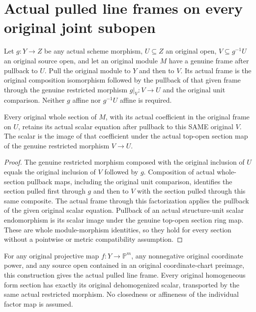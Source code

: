 \section{Actual pulled line frames on every original joint subopen}
\begin{definition}\label{def:actual-pullback-subopen-frame}
\leanok
{}
Let $g:Y\to Z$ be any actual scheme morphism, $U\subseteq Z$ an original open, $V\subseteq g^{-1}U$ an original source open, and let an original module $M$ have a genuine frame after pullback to $U$. Pull the original module to $Y$ and then to $V$. Its actual frame is the original composition isomorphism followed by the pullback of that given frame through the genuine restricted morphism $g|_V:V\to U$ and the original unit comparison. Neither $g$ affine nor $g^{-1}U$ affine is required.
\end{definition}
\begin{theorem}\label{thm:actual-pullback-subopen-scalar}
\leanok
{}
Every original whole section of $M$, with its actual coefficient in the original frame on $U$, retains its actual scalar equation after pullback to this SAME original $V$. The scalar is the image of that coefficient under the actual top-open section map of the genuine restricted morphism $V\to U$.
\end{theorem}
\begin{proof}
The genuine restricted morphism composed with the original inclusion of $U$ equals the original inclusion of $V$ followed by $g$. Composition of actual whole-section pullback maps, including the original unit comparison, identifies the section pulled first through $g$ and then to $V$ with the section pulled through this same composite. The actual frame through this factorization applies the pullback of the given original scalar equation. Pullback of an actual structure-unit scalar endomorphism is its scalar image under the genuine top-open section ring map. These are whole module-morphism identities, so they hold for every section without a pointwise or metric compatibility assumption.
\end{proof}
\begin{theorem}\label{thm:actual-projective-subopen-homogeneous-frame}
\leanok
{}
For any original projective map $f:Y\to\mathbb P^m$, any nonnegative original coordinate power, and any source open contained in an original coordinate-chart preimage, this construction gives the actual pulled line frame. Every original homogeneous form section has exactly its original dehomogenized scalar, transported by the same actual restricted morphism. No closedness or affineness of the individual factor map is assumed.
\end{theorem}
